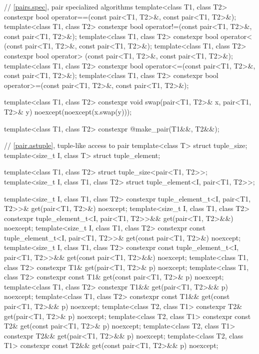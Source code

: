 \begin{codeblock}
{  // \ref{pairs.spec}, pair specialized algorithms
  template<class T1, class T2>
    constexpr bool operator==(const pair<T1, T2>&, const pair<T1, T2>&);
  template<class T1, class T2>
    constexpr bool operator!=(const pair<T1, T2>&, const pair<T1, T2>&);
  template<class T1, class T2>
    constexpr bool operator< (const pair<T1, T2>&, const pair<T1, T2>&);
  template<class T1, class T2>
    constexpr bool operator> (const pair<T1, T2>&, const pair<T1, T2>&);
  template<class T1, class T2>
    constexpr bool operator<=(const pair<T1, T2>&, const pair<T1, T2>&);
  template<class T1, class T2>
    constexpr bool operator>=(const pair<T1, T2>&, const pair<T1, T2>&);

  template<class T1, class T2>
    constexpr void swap(pair<T1, T2>& x, pair<T1, T2>& y) noexcept(noexcept(x.swap(y)));

  template<class T1, class T2>
    constexpr @\seebelow@ make_pair(T1&&, T2&&);

  // \ref{pair.astuple}, tuple-like access to pair
  template<class T> struct tuple_size;
  template<size_t I, class T> struct tuple_element;

  template<class T1, class T2> struct tuple_size<pair<T1, T2>>;
  template<size_t I, class T1, class T2> struct tuple_element<I, pair<T1, T2>>;

  template<size_t I, class T1, class T2>
    constexpr tuple_element_t<I, pair<T1, T2>>& get(pair<T1, T2>&) noexcept;
  template<size_t I, class T1, class T2>
    constexpr tuple_element_t<I, pair<T1, T2>>&& get(pair<T1, T2>&&) noexcept;
  template<size_t I, class T1, class T2>
    constexpr const tuple_element_t<I, pair<T1, T2>>& get(const pair<T1, T2>&) noexcept;
  template<size_t I, class T1, class T2>
    constexpr const tuple_element_t<I, pair<T1, T2>>&& get(const pair<T1, T2>&&) noexcept;
  template<class T1, class T2>
    constexpr T1& get(pair<T1, T2>& p) noexcept;
  template<class T1, class T2>
    constexpr const T1& get(const pair<T1, T2>& p) noexcept;
  template<class T1, class T2>
    constexpr T1&& get(pair<T1, T2>&& p) noexcept;
  template<class T1, class T2>
    constexpr const T1&& get(const pair<T1, T2>&& p) noexcept;
  template<class T2, class T1>
    constexpr T2& get(pair<T1, T2>& p) noexcept;
  template<class T2, class T1>
    constexpr const T2& get(const pair<T1, T2>& p) noexcept;
  template<class T2, class T1>
    constexpr T2&& get(pair<T1, T2>&& p) noexcept;
  template<class T2, class T1>
    constexpr const T2&& get(const pair<T1, T2>&& p) noexcept;

}
\end{codeblock}
